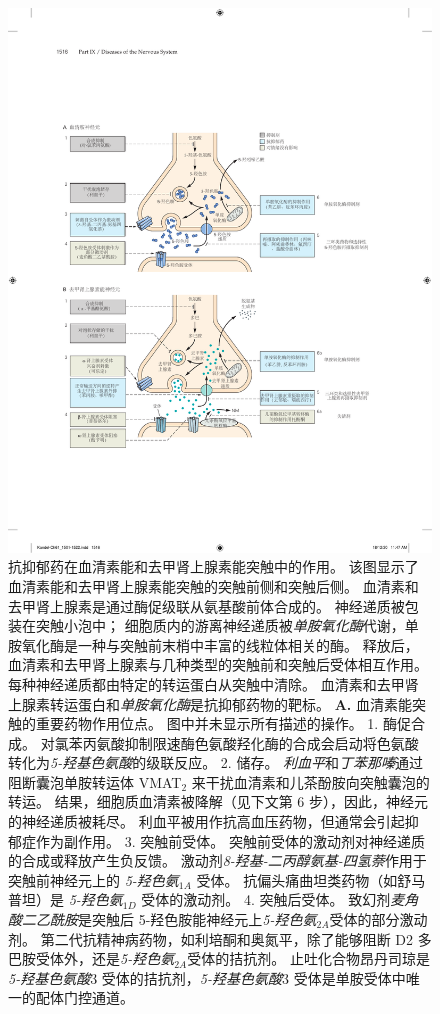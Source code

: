 \begin{figure}[htbp] \label{fig:61_7}
	\centering
	\includegraphics[width=0.63\linewidth]{chap61/fig_61_7}
	\caption{抗抑郁药在血清素能和去甲肾上腺素能突触中的作用。
	该图显示了血清素能和去甲肾上腺素能突触的突触前侧和突触后侧。
	血清素和去甲肾上腺素是通过酶促级联从氨基酸前体合成的。
	神经递质被包装在突触小泡中；
	细胞质内的游离神经递质被\textit{单胺氧化酶}代谢，单胺氧化酶是一种与突触前末梢中丰富的线粒体相关的酶。
	释放后，血清素和去甲肾上腺素与几种类型的突触前和突触后受体相互作用。
	每种神经递质都由特定的转运蛋白从突触中清除。
	血清素和去甲肾上腺素转运蛋白和\textit{单胺氧化酶}是抗抑郁药物的靶标。
	\textbf{A.} 血清素能突触的重要药物作用位点。
	图中并未显示所有描述的操作。
	1. 酶促合成。
	对氯苯丙氨酸抑制限速酶色氨酸羟化酶的合成会启动将色氨酸转化为\textit{5-羟基色氨酸}的级联反应。
	2. 储存。
	\textit{利血平}和\textit{丁苯那嗪}通过阻断囊泡单胺转运体 VMAT$_2$ 来干扰血清素和儿茶酚胺向突触囊泡的转运。
	结果，细胞质血清素被降解（见下文第 6 步），因此，神经元的神经递质被耗尽。
	利血平被用作抗高血压药物，但通常会引起抑郁症作为副作用。
	3. 突触前受体。
	突触前受体的激动剂对神经递质的合成或释放产生负反馈。
	激动剂\textit{8-羟基-二丙醇氨基-四氢萘}作用于突触前神经元上的 \textit{5-羟色氨}$_{1A}$ 受体。
	抗偏头痛曲坦类药物（如舒马普坦）是 \textit{5-羟色氨}$_{1D}$ 受体的激动剂。
	4. 突触后受体。
	致幻剂\textit{麦角酸二乙酰胺}是突触后 5-羟色胺能神经元上\textit{5-羟色氨}$_{2A}$受体的部分激动剂。
	第二代抗精神病药物，如利培酮和奥氮平，除了能够阻断 D2 多巴胺受体外，还是\textit{5-羟色氨}$_{2A}$受体的拮抗剂。
	止吐化合物昂丹司琼是 \textit{5-羟基色氨酸}3 受体的拮抗剂，\textit{5-羟基色氨酸}3 受体是单胺受体中唯一的配体门控通道。
}
\end{figure}
